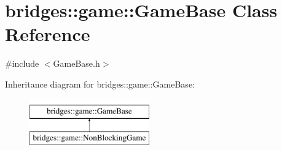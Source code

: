 \hypertarget{classbridges_1_1game_1_1_game_base}{}\section{bridges\+::game\+::Game\+Base Class Reference}
\label{classbridges_1_1game_1_1_game_base}


{\ttfamily \#include $<$Game\+Base.\+h$>$}

Inheritance diagram for bridges\+::game\+::Game\+Base\+:\begin{figure}[H]
\begin{center}
\leavevmode
\includegraphics[height=2.000000cm]{classbridges_1_1game_1_1_game_base}
\end{center}
\end{figure}
